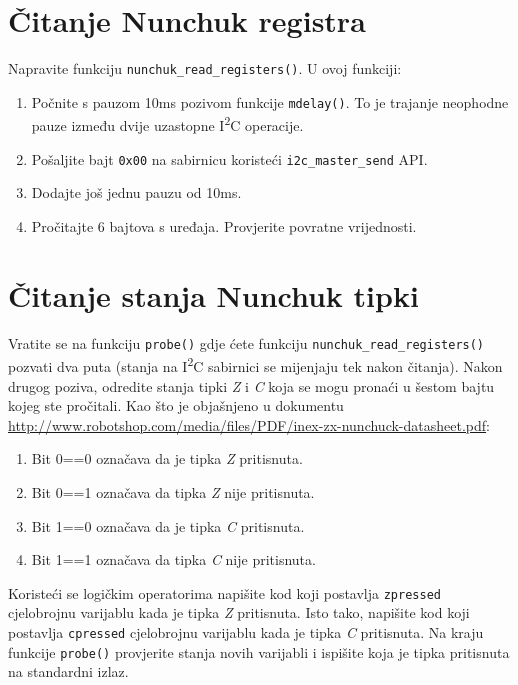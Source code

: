 \documentclass[11pt]{article}
\begin{document}
\section{Čitanje Nunchuk registra}
Napravite funkciju \texttt{nunchuk\_read\_registers()}. U ovoj funkciji:
\begin{enumerate}
	\item Počnite s pauzom 10ms pozivom funkcije \texttt{mdelay()}. To je
		trajanje neophodne pauze između dvije uzastopne I\textsuperscript{2}C
		operacije.
	\item Pošaljite bajt \texttt{0x00} na sabirnicu koristeći
		\texttt{i2c\_master\_send} API.
	\item Dodajte još jednu pauzu od 10ms.
	\item Pročitajte 6 bajtova s uređaja. Provjerite povratne vrijednosti.
\end{enumerate}

\section{Čitanje stanja Nunchuk tipki}
Vratite se na funkciju \texttt{probe()} gdje ćete funkciju
\texttt{nunchuk\_read\_registers()} pozvati dva puta (stanja na
I\textsuperscript{2}C sabirnici se mijenjaju tek nakon čitanja).
Nakon drugog poziva, odredite stanja tipki \textit{Z} i \textit{C} koja se
mogu pronaći u šestom bajtu kojeg ste pročitali.
\newline
\newline
Kao što je objašnjeno u dokumentu
\url{http://www.robotshop.com/media/files/PDF/inex-zx-nunchuck-datasheet.pdf}:
\begin{enumerate}
	\item Bit 0==0 označava da je tipka \textit{Z} pritisnuta.
	\item Bit 0==1 označava da tipka \textit{Z} nije pritisnuta.
	\item Bit 1==0 označava da je tipka \textit{C} pritisnuta.
	\item Bit 1==1 označava da tipka \textit{C} nije pritisnuta.
\end{enumerate}
Koristeći se logičkim operatorima napišite kod koji postavlja \texttt{zpressed}
cjelobrojnu varijablu kada je tipka \textit{Z} pritisnuta. Isto tako, napišite
kod koji postavlja \texttt{cpressed} cjelobrojnu varijablu kada je tipka
\textit{C} pritisnuta.
\newline
\newline
Na kraju funkcije \texttt{probe()} provjerite stanja novih varijabli i ispišite
koja je tipka pritisnuta na standardni izlaz.
\end{document}
